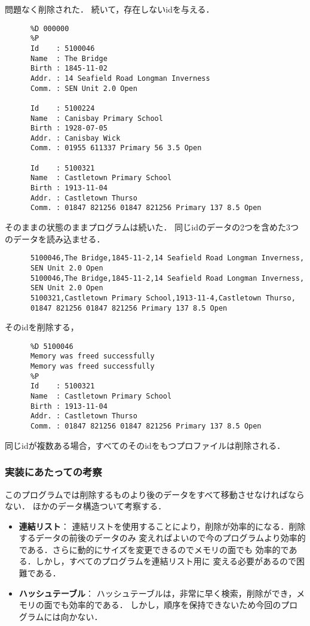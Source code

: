     問題なく削除された．
    続いて，存在しないidを与える．
    \begin{verbatim}
      %D 000000
      %P
      Id    : 5100046
      Name  : The Bridge
      Birth : 1845-11-02
      Addr. : 14 Seafield Road Longman Inverness
      Comm. : SEN Unit 2.0 Open

      Id    : 5100224
      Name  : Canisbay Primary School
      Birth : 1928-07-05
      Addr. : Canisbay Wick
      Comm. : 01955 611337 Primary 56 3.5 Open

      Id    : 5100321
      Name  : Castletown Primary School
      Birth : 1913-11-04
      Addr. : Castletown Thurso
      Comm. : 01847 821256 01847 821256 Primary 137 8.5 Open

    \end{verbatim}
    そのままの状態のままプログラムは続いた．
    同じidのデータの2つを含めた3つのデータを読み込ませる．
    \begin{verbatim}
      5100046,The Bridge,1845-11-2,14 Seafield Road Longman Inverness,
      SEN Unit 2.0 Open
      5100046,The Bridge,1845-11-2,14 Seafield Road Longman Inverness,
      SEN Unit 2.0 Open
      5100321,Castletown Primary School,1913-11-4,Castletown Thurso,
      01847 821256 01847 821256 Primary 137 8.5 Open
    \end{verbatim}
    そのidを削除する，
    \begin{verbatim}
      %D 5100046
      Memory was freed successfully
      Memory was freed successfully
      %P
      Id    : 5100321
      Name  : Castletown Primary School
      Birth : 1913-11-04
      Addr. : Castletown Thurso
      Comm. : 01847 821256 01847 821256 Primary 137 8.5 Open
    \end{verbatim}
    同じidが複数ある場合，すべてのそのidをもつプロファイルは削除される．
    \subsubsection{実装にあたっての考察}
    このプログラムでは削除するものより後のデータをすべて移動させなければならない．
    ほかのデータ構造ついて考察する．
    \begin{itemize}
      \item \textbf{連結リスト}：
        連結リストを使用することにより，削除が効率的になる．削除するデータの前後のデータのみ
        変えればよいので今のプログラムより効率的である．さらに動的にサイズを変更できるのでメモリの面でも
        効率的である．しかし，すべてのプログラムを連結リスト用に
        変える必要があるので困難である．
      \item \textbf{ハッシュテーブル}：
        ハッシュテーブルは，非常に早く検索，削除ができ，メモリの面でも効率的である．
        しかし，順序を保持できないため今回のプログラムには向かない．
    \end{itemize}
